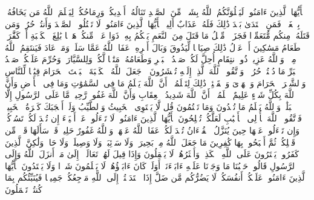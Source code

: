 \stopbuffer%
\startbuffer[\q:5:94]
یَٰۤأَیُّهَا ٱلَّذِینَ ءَامَنُوا۟ لَیَبۡلُوَنَّكُمُ ٱللَّهُ بِشَیۡءࣲ مِّنَ ٱلصَّیۡدِ تَنَالُهُۥۤ أَیۡدِیكُمۡ وَرِمَاحُكُمۡ لِیَعۡلَمَ ٱللَّهُ مَن یَخَافُهُۥ بِٱلۡغَیۡبِۚ فَمَنِ ٱعۡتَدَىٰ بَعۡدَ ذَٰلِكَ فَلَهُۥ عَذَابٌ أَلِیمࣱ%
\stopbuffer%
\startbuffer[\q:5:95]
یَٰۤأَیُّهَا ٱلَّذِینَ ءَامَنُوا۟ لَا تَقۡتُلُوا۟ ٱلصَّیۡدَ وَأَنتُمۡ حُرُمࣱۚ وَمَن قَتَلَهُۥ مِنكُم مُّتَعَمِّدࣰا فَجَزَاۤءࣱ مِّثۡلُ مَا قَتَلَ مِنَ ٱلنَّعَمِ یَحۡكُمُ بِهِۦ ذَوَا عَدۡلࣲ مِّنكُمۡ هَدۡیَۢا بَٰلِغَ ٱلۡكَعۡبَةِ أَوۡ كَفَّٰرَةࣱ طَعَامُ مَسَٰكِینَ أَوۡ عَدۡلُ ذَٰلِكَ صِیَامࣰا لِّیَذُوقَ وَبَالَ أَمۡرِهِۦۗ عَفَا ٱللَّهُ عَمَّا سَلَفَۚ وَمَنۡ عَادَ فَیَنتَقِمُ ٱللَّهُ مِنۡهُۚ وَٱللَّهُ عَزِیزࣱ ذُو ٱنتِقَامٍ%
\stopbuffer%
\startbuffer[\q:5:96]
أُحِلَّ لَكُمۡ صَیۡدُ ٱلۡبَحۡرِ وَطَعَامُهُۥ مَتَٰعࣰا لَّكُمۡ وَلِلسَّیَّارَةِۖ وَحُرِّمَ عَلَیۡكُمۡ صَیۡدُ ٱلۡبَرِّ مَا دُمۡتُمۡ حُرُمࣰاۗ وَٱتَّقُوا۟ ٱللَّهَ ٱلَّذِیۤ إِلَیۡهِ تُحۡشَرُونَ%
\stopbuffer%
\startbuffer[\q:5:97]
۞ جَعَلَ ٱللَّهُ ٱلۡكَعۡبَةَ ٱلۡبَیۡتَ ٱلۡحَرَامَ قِیَٰمࣰا لِّلنَّاسِ وَٱلشَّهۡرَ ٱلۡحَرَامَ وَٱلۡهَدۡیَ وَٱلۡقَلَٰۤئِدَۚ ذَٰلِكَ لِتَعۡلَمُوۤا۟ أَنَّ ٱللَّهَ یَعۡلَمُ مَا فِی ٱلسَّمَٰوَٰتِ وَمَا فِی ٱلۡأَرۡضِ وَأَنَّ ٱللَّهَ بِكُلِّ شَیۡءٍ عَلِیمٌ%
\stopbuffer%
\startbuffer[\q:5:98]
ٱعۡلَمُوۤا۟ أَنَّ ٱللَّهَ شَدِیدُ ٱلۡعِقَابِ وَأَنَّ ٱللَّهَ غَفُورࣱ رَّحِیمࣱ%
\stopbuffer%
\startbuffer[\q:5:99]
مَّا عَلَى ٱلرَّسُولِ إِلَّا ٱلۡبَلَٰغُۗ وَٱللَّهُ یَعۡلَمُ مَا تُبۡدُونَ وَمَا تَكۡتُمُونَ%
\stopbuffer%
\startbuffer[\q:5:100]
قُل لَّا یَسۡتَوِی ٱلۡخَبِیثُ وَٱلطَّیِّبُ وَلَوۡ أَعۡجَبَكَ كَثۡرَةُ ٱلۡخَبِیثِۚ فَٱتَّقُوا۟ ٱللَّهَ یَٰۤأُو۟لِی ٱلۡأَلۡبَٰبِ لَعَلَّكُمۡ تُفۡلِحُونَ%
\stopbuffer%
\startbuffer[\q:5:101]
یَٰۤأَیُّهَا ٱلَّذِینَ ءَامَنُوا۟ لَا تَسۡءَلُوا۟ عَنۡ أَشۡیَاۤءَ إِن تُبۡدَ لَكُمۡ تَسُؤۡكُمۡ وَإِن تَسۡءَلُوا۟ عَنۡهَا حِینَ یُنَزَّلُ ٱلۡقُرۡءَانُ تُبۡدَ لَكُمۡ عَفَا ٱللَّهُ عَنۡهَاۗ وَٱللَّهُ غَفُورٌ حَلِیمࣱ%
\stopbuffer%
\startbuffer[\q:5:102]
قَدۡ سَأَلَهَا قَوۡمࣱ مِّن قَبۡلِكُمۡ ثُمَّ أَصۡبَحُوا۟ بِهَا كَٰفِرِینَ%
\stopbuffer%
\startbuffer[\q:5:103]
مَا جَعَلَ ٱللَّهُ مِنۢ بَحِیرَةࣲ وَلَا سَاۤئِبَةࣲ وَلَا وَصِیلَةࣲ وَلَا حَامࣲ وَلَٰكِنَّ ٱلَّذِینَ كَفَرُوا۟ یَفۡتَرُونَ عَلَى ٱللَّهِ ٱلۡكَذِبَۖ وَأَكۡثَرُهُمۡ لَا یَعۡقِلُونَ%
\stopbuffer%
\startbuffer[\q:5:104]
وَإِذَا قِیلَ لَهُمۡ تَعَالَوۡا۟ إِلَىٰ مَاۤ أَنزَلَ ٱللَّهُ وَإِلَى ٱلرَّسُولِ قَالُوا۟ حَسۡبُنَا مَا وَجَدۡنَا عَلَیۡهِ ءَابَاۤءَنَاۤۚ أَوَلَوۡ كَانَ ءَابَاۤؤُهُمۡ لَا یَعۡلَمُونَ شَیۡءࣰا وَلَا یَهۡتَدُونَ%
\stopbuffer%
\startbuffer[\q:5:105]
یَٰۤأَیُّهَا ٱلَّذِینَ ءَامَنُوا۟ عَلَیۡكُمۡ أَنفُسَكُمۡۖ لَا یَضُرُّكُم مَّن ضَلَّ إِذَا ٱهۡتَدَیۡتُمۡۚ إِلَى ٱللَّهِ مَرۡجِعُكُمۡ جَمِیعࣰا فَیُنَبِّئُكُم بِمَا كُنتُمۡ تَعۡمَلُونَ%
